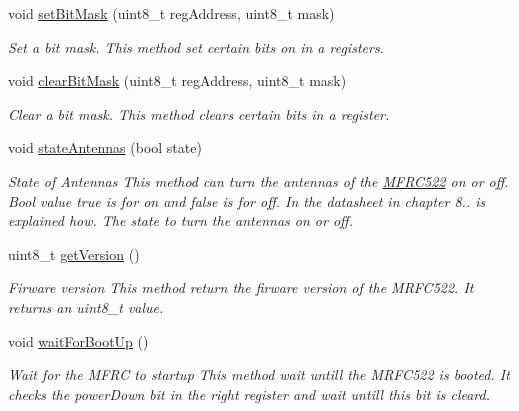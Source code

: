 \begin{DoxyCompactItemize}
void \hyperlink{classMFRC522_a398266ee566ff9a51e6d814dd19cf3fd}{set\+Bit\+Mask} (uint8\+\_\+t reg\+Address, uint8\+\_\+t mask)
\begin{DoxyCompactList}\small\item\em Set a bit mask.  This method set certain bits on in a registers. \end{DoxyCompactList}\item 
void \hyperlink{classMFRC522_ab3127828649757df8bdf34b3f329ee8a}{clear\+Bit\+Mask} (uint8\+\_\+t reg\+Address, uint8\+\_\+t mask)
\begin{DoxyCompactList}\small\item\em Clear a bit mask.  This method clears certain bits in a register. \end{DoxyCompactList}\item 
\mbox{\label{classMFRC522_a7a9e65b7320721d0e823fd610cb22a84}} 
void \hyperlink{classMFRC522_a7a9e65b7320721d0e823fd610cb22a84}{state\+Antennas} (bool state)
\begin{DoxyCompactList}\small\item\em State of Antennas  This method can turn the antennas of the \hyperlink{classMFRC522}{M\+F\+R\+C522} on or off. Bool value true is for on and false is for off. In the datasheet in chapter 8.. is explained how.  The state to turn the antenna\textquotesingle{}s on or off. \end{DoxyCompactList}\item 
\mbox{\label{classMFRC522_a2854a3633ef04780f268f8c1030ac4b5}} 
uint8\+\_\+t \hyperlink{classMFRC522_a2854a3633ef04780f268f8c1030ac4b5}{get\+Version} ()
\begin{DoxyCompactList}\small\item\em Firware version  This method return the firware version of the M\+R\+F\+C522. It returns an uint8\+\_\+t value. \end{DoxyCompactList}\item 
\mbox{\label{classMFRC522_a6ccddf14dedf566cb8b19336984f0303}} 
void \hyperlink{classMFRC522_a6ccddf14dedf566cb8b19336984f0303}{wait\+For\+Boot\+Up} ()
\begin{DoxyCompactList}\small\item\em Wait for the M\+F\+RC to startup  This method wait untill the M\+R\+F\+C522 is booted. It checks the power\+Down bit in the right register and wait untill this bit is cleard. \end{DoxyCompactList}\item 

\end{DoxyCompactItemize}
